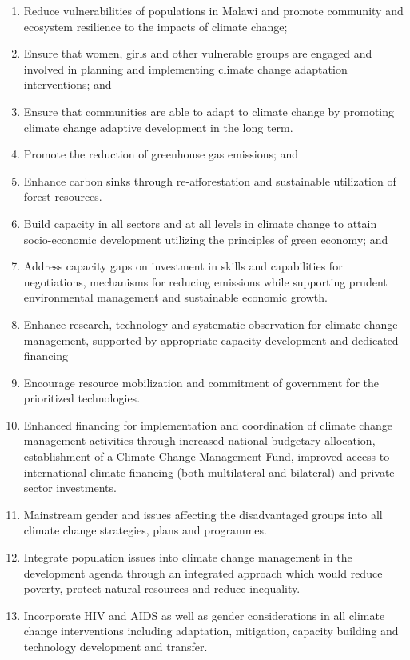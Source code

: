 \documentclass[
]{book}
\begin{document}
\begin{enumerate}
\def\labelenumi{\arabic{enumi}.}
\item
  Reduce vulnerabilities of populations in Malawi and promote community and ecosystem resilience to the impacts of climate change;
\item
  Ensure that women, girls and other vulnerable groups are engaged and involved in planning and implementing climate change adaptation interventions; and
\item
  Ensure that communities are able to adapt to climate change by promoting climate change adaptive development in the long term.
\item
  Promote the reduction of greenhouse gas emissions; and
\item
  Enhance carbon sinks through re-afforestation and sustainable utilization of forest resources.
\item
  Build capacity in all sectors and at all levels in climate change to attain socio-economic development utilizing the principles of green economy; and
\item
  Address capacity gaps on investment in skills and capabilities for negotiations, mechanisms for reducing emissions while supporting prudent environmental
  management and sustainable economic growth.
\item
  Enhance research, technology and systematic observation for climate change management, supported by appropriate capacity development and dedicated financing
\item
  Encourage resource mobilization and commitment of government for the prioritized technologies.
\item
  Enhanced financing for implementation and coordination of climate change management activities through increased national budgetary allocation, establishment
  of a Climate Change Management Fund, improved access to international climate financing (both multilateral and bilateral) and private sector investments.
\item
  Mainstream gender and issues affecting the disadvantaged groups into all climate change strategies, plans and programmes.
\item
  Integrate population issues into climate change management in the development agenda through an integrated approach which would reduce poverty, protect
  natural resources and reduce inequality.
\item
  Incorporate HIV and AIDS as well as gender considerations in all climate change interventions including adaptation, mitigation, capacity building and
  technology development and transfer.
\end{enumerate}
\end{document}
